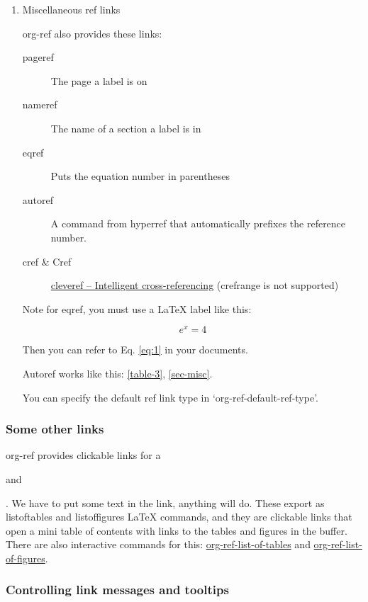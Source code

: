 \documentclass[11pt]{article}
\begin{document}
\begin{enumerate}
\item Miscellaneous ref links  \label{sec-misc}
\label{sec:org82d2b5d}
  

org-ref also provides these links:

\begin{description}
\item[{pageref}] The page a label is on
\item[{nameref}] The name of a section a label is in
\item[{eqref}] Puts the equation number in parentheses
\item[{autoref}] A command from hyperref that automatically prefixes the reference number.
\item[{cref \& Cref}] \href{https://www.ctan.org/tex-archive/macros/latex/contrib/cleveref?lang=en}{cleveref – Intelligent cross-referencing} (crefrange is not supported)
\end{description}

Note for eqref, you must use a \LaTeX{} label like this:

\begin{equation}
e^x = 4 \label{eq:1}
\end{equation}

Then you can refer to Eq. \eqref{eq:1} in your documents.

Autoref works like this: \autoref{table-3}, \autoref{sec-misc}.

You can specify the default ref link type in `org-ref-default-ref-type'.
\end{enumerate}

\subsubsection{Some other links}
\label{sec:org065c779}
 

org-ref provides clickable links for a \listoftables and \listoffigures. We have to put some text in the link, anything will do. These export as listoftables and listoffigures \LaTeX{} commands, and they are clickable links that open a mini table of contents with links to the tables and figures in the buffer. There are also interactive commands for this: \url{org-ref-list-of-tables} and \url{org-ref-list-of-figures}.

\subsubsection{Controlling link messages and tooltips}
\label{sec:org6865bf8}
\end{document}
